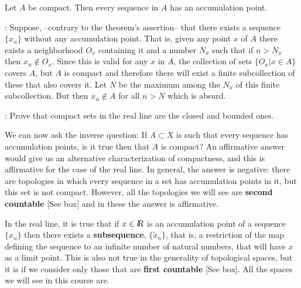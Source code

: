 \espa

\bteo
Let $A$ be compact. Then every sequence in $A$ has an accumulation point.
\eteo

\espa

\pru:
Suppose, --contrary to the theorem's assertion-- that
there exists a sequence $\{x_n\}$ without any accumulation point.
That is, given any point $x$ of $A$ there exists a neighborhood $O_x$
containing it and a number $N_x$ such that if $n > N_x$ then $x_n \notin
O_x$. Since this is valid for any $x$ in $A$, the collection of
sets $\{ O_x | x \in A \}$ covers $A$, but $A$ is compact and therefore
there will exist a finite subcollection of these that also covers it.
Let $N$ be the maximum among the $N_x$ of this finite subcollection. But then
$x_n \notin A$ for all $n > N$ which is absurd.  

\ejer: Prove that compact sets in the real line are the
closed and bounded ones.

We can now ask the inverse question: If $A \subset X$ is
such that every sequence has accumulation points, is it true
then that $A$ is compact? An affirmative answer would give us
an alternative characterization of compactness, and this is
affirmative for the case of the real line. In general, the answer is
negative: there are topologies in which every sequence in a
set has accumulation points in it, but this set is not
compact. However, all the topologies we will see are {\bf second countable} [See box] and in these
the answer is affirmative.

In the real line, it is true that if $x \in \mbox{\sl {l$\!\!\!\;\:\!$R}} $ is an accumulation point of a sequence $\{x_n\}$ then there exists a {\bf
subsequence}, $\{\tilde{x}_n\}$, that is, a restriction of the
map defining the sequence to an infinite number of natural
numbers, that will have $x$ as a limit point. This is also not
true in the generality of topological spaces, but it is if we consider only those that are {\bf first countable} [See box]. All the spaces we will see in this
course are.

\espa 
\vfill   %

